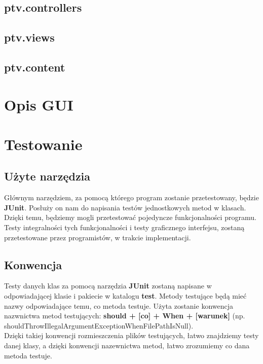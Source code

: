 \documentclass[]{article}
\begin{document}
        \subsection{ptv.controllers} %
        \subsection{ptv.views} %
        \subsection{ptv.content}

    
    \section{Opis GUI} %
    
    
    \section{Testowanie}
        \subsection{Użyte narzędzia}
        Głównym narzędziem, za pomocą którego program zostanie przetestowany, będzie \textbf{JUnit}.
        Posłuży on nam do napisania testów jednostkowych metod w klasach.
        Dzięki temu, będziemy mogli przetestować pojedyncze funkcjonalności programu.\\
        Testy integralności tych funkcjonalności i testy graficznego interfejsu, zostaną przetestowane przez programistów, w trakcie implementacji.
        
        \subsection{Konwencja}
        Testy danych klas za pomocą narzędzia \textbf{JUnit} zostaną napisane w odpowiadającej klasie i pakiecie
        w katalogu \textbf{test}.
        Metody testujące będą mieć nazwy odpowiadające temu, co metoda testuje.
        Użyta zostanie konwencja nazwnictwa metod testujących: \textbf{should + [co] + When + [warunek]}
        (np. shouldThrowIllegalArgumentExceptionWhenFilePathIsNull).\\
        Dzięki takiej konwencji rozmieszczenia plików testujących, łatwo znajdziemy testy danej klasy,
        a dzięki konwencji nazewnictwa metod, łatwo zrozumiemy co dana metoda testuje.
        
\end{document}

